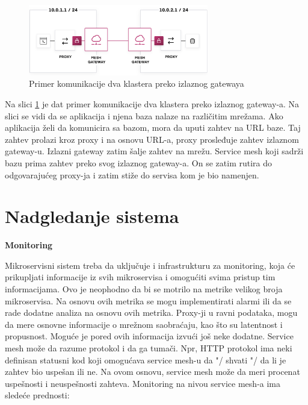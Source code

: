 \documentclass[a4paper,12pt]{report}
\begin{document}
\begin{figure}[h]
    \centering
    \includegraphics[width=0.7\textwidth]{egress_gateway_example}
    \caption{Primer komunikacije dva klastera preko izlaznog gatewaya}
    \label{fig:egress-gateway-example}
\end{figure} 

Na slici \ref{fig:egress-gateway-example} je dat primer komunikacije dva klastera preko izlaznog gateway-a. Na slici se vidi da se  aplikacija i njena baza nalaze na različitim mrežama. Ako aplikacija želi da komunicira sa bazom, mora da uputi zahtev na URL baze. Taj zahtev prolazi kroz proxy i na osnovu URL-a, proxy prosleđuje zahtev izlaznom gateway-u. Izlazni gateway zatim šalje zahtev na mrežu. Service mesh koji sadrži bazu prima zahtev preko svog izlaznog gateway-a. On se zatim rutira do odgovarajućeg proxy-ja i zatim stiže do servisa kom je bio namenjen. \newline

\section{Nadgledanje sistema}

\textbf{Monitoring}\newline

Mikroservisni sistem treba da uključuje i infrastrukturu za monitoring, koja će prikupljati informacije iz svih mikroservisa i omogućiti svima pristup tim informacijama. Ovo je neophodno da bi se motrilo na metrike velikog broja mikroservisa. Na osnovu ovih metrika se mogu implementirati alarmi ili da se rade dodatne analiza na osnovu ovih metrika. Proxy-ji u ravni podataka, mogu da mere osnovne informacije o mrežnom saobraćaju, kao što su latentnost i propusnost. Moguće je pored ovih informacija izvući još neke dodatne. Service mesh može da razume protokol i da ga tumači. Npr, HTTP protokol ima neki definisan statusni kod koji omogućava service mesh-u da "/ shvati "/ da li je zahtev bio uspešan ili ne. Na ovom osnovu, service mesh može da meri procenat uspešnosti i neuspešnosti zahteva.  Monitoring na nivou service mesh-a ima sledeće prednosti: 
\end{document}
